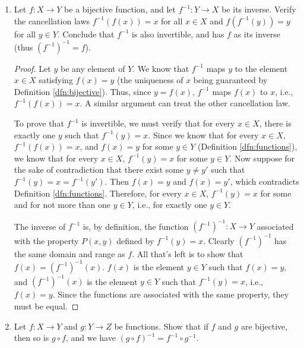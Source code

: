 \documentclass[../main.tex]{subfiles}
\begin{document}
\begin{enumerate}[ref={\thesection.\arabic*}]
\begin{proof}
    \end{proof}
    \item \label{exr:3.3.6}Let $f:X\to Y$ be a bijective function, and let $f^{-1}:Y\to X$ be its inverse. Verify the cancellation laws $f^{-1}(f(x))=x$ for all $x\in X$ and $f(f^{-1}(y))=y$ for all $y\in Y$. Conclude that $f^{-1}$ is also invertible, and has $f$ as its inverse (thus $(f^{-1})^{-1}=f$).
    \begin{proof}
        Let $y$ be any element of $Y$. We know that $f^{-1}$ maps $y$ to the element $x\in X$ satisfying $f(x)=y$ (the uniqueness of $x$ being guaranteed by Definition \ref{dfn:bijective}). Thus, since $y=f(x)$, $f^{-1}$ maps $f(x)$ to $x$, i.e., $f^{-1}(f(x))=x$. A similar argument can treat the other cancellation law.\par
        To prove that $f^{-1}$ is invertible, we must verify that for every $x\in X$, there is exactly one $y$ such that $f^{-1}(y)=x$. Since we know that for every $x\in X$, $f^{-1}(f(x))=x$, and $f(x)=y$ for some $y\in Y$ (Definition \ref{dfn:functions}), we know that for every $x\in X$, $f^{-1}(y)=x$ for some $y\in Y$. Now suppose for the sake of contradiction that there exist some $y\neq y'$ such that $f^{-1}(y)=x=f^{-1}(y')$. Then $f(x)=y$ and $f(x)=y'$, which contradicts Definition \ref{dfn:functions}. Therefore, for every $x\in X$, $f^{-1}(y)=x$ for some and for not more than one $y\in Y$, i.e., for exactly one $y\in Y$.\par
        The inverse of $f^{-1}$ is, by definition, the function $(f^{-1})^{-1}:X\to Y$ associated with the property $P(x,y)$ defined by $f^{-1}(y)=x$. Clearly $(f^{-1})^{-1}$ has the same domain and range as $f$. All that's left is to show that $f(x)=(f^{-1})^{-1}(x)$. $f(x)$ is the element $y\in Y$ such that $f(x)=y$, and $(f^{-1})^{-1}(x)$ is the element $y\in Y$ such that $f^{-1}(y)=x$, i.e., $f(x)=y$. Since the functions are associated with the same property, they must be equal.
    \end{proof}
    \item \label{exr:3.3.7}Let $f:X\to Y$ and $g:Y\to Z$ be functions. Show that if $f$ and $g$ are bijective, then so is $g\circ f$, and we have $(g\circ f)^{-1}=f^{-1}\circ g^{-1}$.

\end{enumerate}
\end{document}
